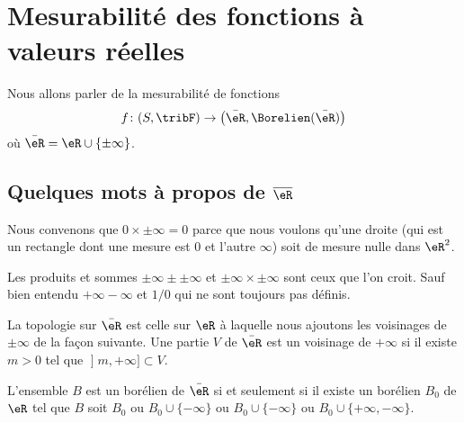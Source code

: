 \section{Mesurabilité des fonctions à valeurs réelles}

Nous allons parler de la mesurabilité de fonctions
\begin{equation}
    f\colon (S,\tribF)\to \big( \bar \eR,\Borelien(\bar \eR) \big)
\end{equation}
où \( \bar \eR=\eR\cup\{ \pm\infty \}\).

\subsection{Quelques mots à propos de $\overline{ \eR }$}        %

\begin{normaltext}      \label{normooGAAJooUPCbzG}
Nous convenons que \( 0\times\pm\infty=0\) parce que nous voulons qu'une droite (qui est un rectangle dont une mesure est \( 0\) et l'autre \( \infty\)) soit de mesure nulle dans \( \eR^2\).

Les produits et sommes \( \pm\infty\pm\pm\infty\) et \( \pm\infty\times \pm\infty\) sont ceux que l'on croit. Sauf bien entendu \( +\infty-\infty\) et \( 1/0\) qui ne sont toujours pas définis.
\end{normaltext}

\begin{definition}
La topologie sur \(\bar \eR\) est celle sur \( \eR\) à laquelle nous ajoutons les voisinages de \( \pm\infty\) de la façon suivante. Une partie \( V\) de \( \bar \eR\) est un voisinage de \( +\infty\) si il existe \( m>0\) tel que \( \mathopen] m , +\infty \mathclose]\subset V\).
\end{definition}

\begin{lemma}       \label{LEMooBLOLooAdNViv}
    L'ensemble \( B\) est un borélien de \( \bar \eR\) si et seulement si il existe un borélien \( B_0\) de \( \eR\) tel que \( B\) soit \( B_0\) ou \( B_0\cup\{ -\infty \}\) ou \( B_0\cup\{ -\infty \}\) ou \( B_0\cup\{ +\infty,-\infty \}\).
\end{lemma}

